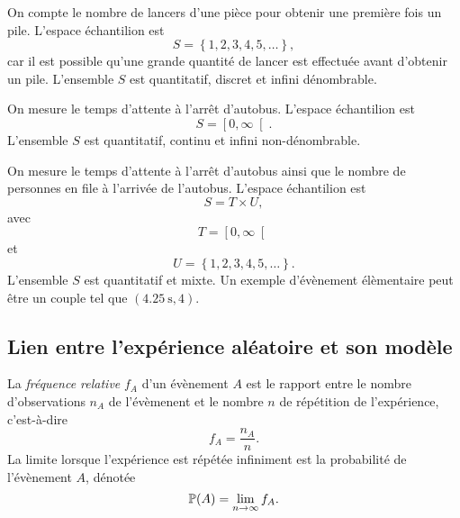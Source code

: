 \documentclass[11pt]{article}
\renewcommand\P{%
	\ensuremath{%
		\mathbb{P}%
	}%
}%
\begin{document}
\begin{exemple}
	On compte le nombre de lancers d'une pièce pour obtenir une première fois
	un pile. L'espace échantilion est
	\begin{equation*}
		S=\left\{1,2,3,4,5,\dots\right\},
	\end{equation*}
	car il est possible qu'une grande quantité de lancer est effectuée avant
	d'obtenir un pile. L'ensemble $S$ est quantitatif, discret et
	infini dénombrable.
\end{exemple}

\pagebreak
\begin{exemple}
	On mesure le temps d'attente à l'arrêt d'autobus. L'espace échantilion est
	\begin{equation*}
		S=\left[0,\infty\right[.
	\end{equation*}
	L'ensemble $S$ est quantitatif, continu et infini non-dénombrable.
\end{exemple}

\begin{exemple}
	On mesure le temps d'attente à l'arrêt d'autobus ainsi que le nombre de
	personnes en file à l'arrivée de l'autobus. L'espace échantilion est
	\begin{equation*}
		S=T\times U,
	\end{equation*}
	avec
	\begin{equation*}
		T=\left[0,\infty\right[
	\end{equation*}
	et
	\begin{equation*}
		U=\left\{1,2,3,4,5,\dots\right\}.
	\end{equation*}
	L'ensemble $S$ est quantitatif et mixte. Un exemple d'évènement élèmentaire
	peut être un couple tel que $\left(\SI{4.25}{\second}, 4\right)$.
\end{exemple}

\subsection{Lien entre l'expérience aléatoire et son modèle}
\begin{definition}
	La \textit{fréquence relative} $f_A$ d'un évènement $A$ est le rapport
	entre le nombre d'observations $n_A$ de l'évèmenent et le nombre $n$ de
	répétition de l'expérience, c'est-à-dire
	\begin{equation*}
		f_A=\frac{n_A}{n}.
	\end{equation*}
	La limite lorsque l'expérience est répétée infiniment est la probabilité de
	l'évènement $A$, dénotée
	\begin{equation*}
		\P(A)=\lim_{n\rightarrow\infty}f_A.
	\end{equation*}
\end{definition}
\end{document}
